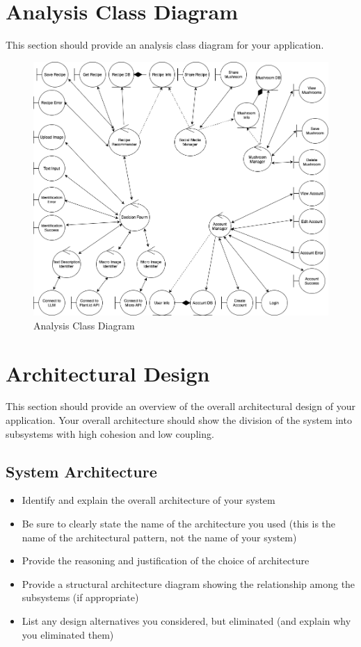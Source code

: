 \documentclass[]{article}
\begin{document}

\clearpage
\section{Analysis Class Diagram}
\label{sec:analysis_class_diagram}
This section should provide an analysis class diagram for your application.
\begin{figure}[h]
    \centering
    \includegraphics[width=1\textwidth]{AnalysisClassDiagram.png}
    \caption{Analysis Class Diagram}
    \label{fig:sample}
\end{figure}

\clearpage
\section{Architectural Design}
\label{sec:architectural_design}
This section should provide an overview of the overall architectural design of your application. Your overall architecture should show the division of the system into subsystems with high cohesion and low coupling.

\subsection{System Architecture}
\label{sub:system_architecture}
\begin{itemize}
	\item Identify and explain the overall architecture of your system
	\item Be sure to clearly state the name of the architecture you used (this is the name of the architectural pattern, not the name of your system)
	\item Provide the reasoning and justification of the choice of architecture
	\item Provide a structural architecture diagram showing the relationship among the subsystems (if appropriate)
	\item List any design alternatives you considered, but eliminated (and explain why you eliminated them)
\end{itemize}
\end{document}
